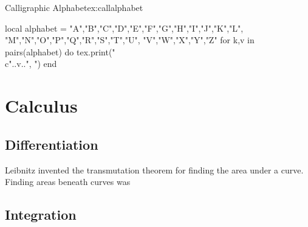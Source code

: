 {\begin{texexample}{Calligraphic Alphabet}{ex:callalphabet}
\providecommand*{\cA}{\ensuremath{\mathcal{A}}}
\providecommand*{\cB}{\ensuremath{\mathcal{B}}}
\providecommand*{\cC}{\ensuremath{\mathcal{C}}}
\providecommand*{\cD}{\ensuremath{\mathcal{D}}}
\providecommand*{\cE}{\ensuremath{\mathcal{E}}}
\providecommand*{\cF}{\ensuremath{\mathcal{F}}}
\providecommand*{\cG}{\ensuremath{\mathcal{G}}}
\providecommand*{\cH}{\ensuremath{\mathcal{H}}}
\providecommand*{\cI}{\ensuremath{\mathcal{I}}}
\providecommand*{\cJ}{\ensuremath{\mathcal{J}}}
\providecommand*{\cK}{\ensuremath{\mathcal{K}}}
\providecommand*{\cL}{\ensuremath{\mathcal{L}}}
\providecommand*{\cM}{\ensuremath{\mathcal{M}}}
\providecommand*{\cN}{\ensuremath{\mathcal{N}}}
\providecommand*{\cO}{\ensuremath{\mathcal{O}}}
\providecommand*{\cP}{\ensuremath{\mathcal{P}}}
\providecommand*{\cQ}{\ensuremath{\mathcal{Q}}}
\providecommand*{\cR}{\ensuremath{\mathcal{R}}}
\providecommand*{\cS}{\ensuremath{\mathcal{S}}}
\providecommand*{\cT}{\ensuremath{\mathcal{T}}}
\providecommand*{\cU}{\ensuremath{\mathcal{U}}}
\providecommand*{\cV}{\ensuremath{\mathcal{V}}}
\providecommand*{\cW}{\ensuremath{\mathcal{W}}}
\providecommand*{\cX}{\ensuremath{\mathcal{X}}}
\providecommand*{\cY}{\ensuremath{\mathcal{Y}}}
\providecommand*{\cZ}{\ensuremath{\mathcal{Z}}}
\begin{luacode}
local alphabet = {"A","B","C","D","E","F","G","H","I","J","K","L",
                  "M","N","O","P","Q","R","S","T","U",
                  "V","W","X","Y","Z"}
for k,v in pairs(alphabet) do
	tex.print("\\c"..v..", ")
end
\end{luacode}
\end{texexample}


\section{Calculus}



\subsection*{Differentiation}
Leibnitz invented the transmutation theorem for finding the area under a curve. Finding areas beneath curves
was 


\subsection*{Integration}

}
